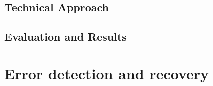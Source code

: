\documentclass[Dual]{iitddiss}
\begin{document}
\section{Technical Approach}

\section{Evaluation and Results}

\pagebreak

% 


\chapter{Error detection and recovery}
\label{chap:part-2}
% 

% 
\end{document}
